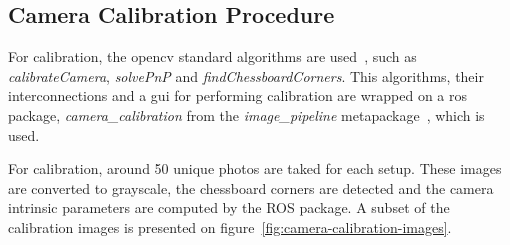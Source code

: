 \subsection{Camera Calibration Procedure}
For calibration, the \ac{opencv} standard algorithms are used~\cite{opencv_doc}, such as \emph{calibrateCamera}, \emph{solvePnP} and \emph{findChessboardCorners}. This algorithms, their interconnections and a \ac{gui} for performing calibration are wrapped on a \ac{ros} package, \emph{camera\_calibration} from the \emph{image\_pipeline} metapackage~\cite{cameraCalibrationRos}, which is used.

For calibration, around 50 unique photos are taked for each setup. These images are converted to grayscale, the chessboard corners are detected and the camera intrinsic parameters are computed by the ROS package. A subset of the calibration images is presented on figure~\ref{fig:camera-calibration-images}.

